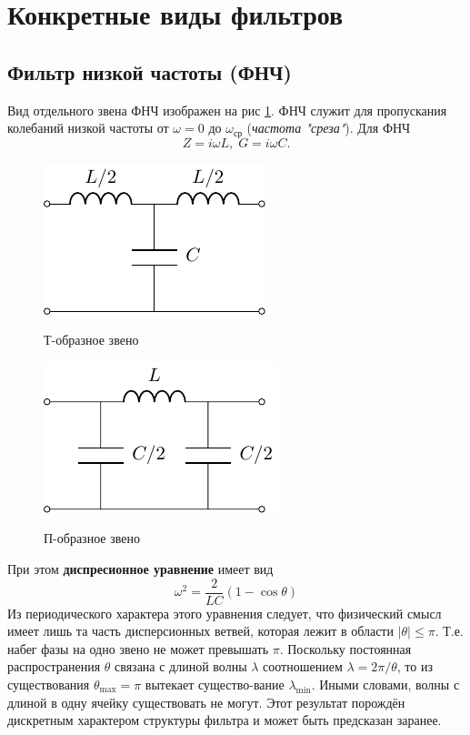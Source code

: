\section{Конкретные виды фильтров}
\subsection{Фильтр низкой частоты (ФНЧ)}
Вид отдельного звена ФНЧ изображен на рис \ref{fig:1.1}. ФНЧ служит для пропускания колебаний низкой частоты от $\omega=0$ до $\omega_{\text{ср}}$ (\textit{частота "среза"}). Для ФНЧ
\begin{equation}
\label{eq:5.1.1}
Z=i\omega L,\;G=i\omega C.
\end{equation}
\begin{figure}[h!]
	\begin{minipage}{0.49\linewidth}
		\centering
		\includegraphics[]{chem/FLF/FLFT.pdf}
		\caption*{Т-образное звено}
	\end{minipage}
\begin{minipage}{0.49\linewidth}
	\centering
	\includegraphics[]{chem/FLF/FLFP.pdf}
	\caption*{П-образное звено}
\end{minipage}
\caption{}
\label{fig:1.1}
\end{figure}
При этом \textbf{диспресионное уравнение} имеет вид 
\begin{equation}
\label{eq:5.1.2}
\omega^2=\frac{2}{LC}(1-\cos\theta)
\end{equation}
Из периодического характера этого уравнения следует, что физический смысл имеет лишь та часть дисперсионных ветвей, которая лежит в области $|\theta|\leq\pi$. Т.е. набег фазы на одно звено не может превышать $\pi$. Поскольку постоянная распространения $\theta$ связана с длиной волны $\lambda$ соотношением $\lambda=2\pi/\theta$, то из существования $\theta_{\text{max}}=\pi$ вытекает существо-вание $\lambda_{\text{min}}$. Иными словами, волны с длиной в одну ячейку существовать не могут. Этот результат порождён дискретным характером структуры фильтра и может быть предсказан заранее.

